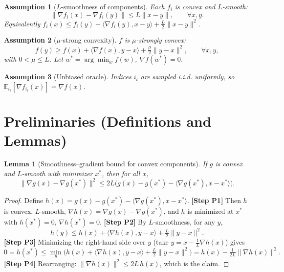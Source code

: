 \documentclass{article}
\newtheorem{lemma}{Lemma}
\newtheorem{assumption}{Assumption}
\begin{document}
\begin{assumption}[$L$-smoothness of components]\label{as:smooth}
Each $f_i$ is convex and $L$-smooth:
\[
\|\nabla f_i(x) - \nabla f_i(y)\| \le L\|x-y\|, \qquad \forall x,y.
\]
Equivalently $f_i(x) \le f_i(y) + \langle \nabla f_i(y), x-y\rangle + \tfrac{L}{2}\|x-y\|^2$.
\end{assumption}

\begin{assumption}[$\mu$-strong convexity]\label{as:sc}
$f$ is $\mu$-strongly convex:
\[
f(y) \ge f(x) + \langle \nabla f(x), y-x\rangle + \tfrac{\mu}{2}\|y-x\|^2, \qquad \forall x,y,
\]
with $0 < \mu \le L$. Let $w^*=\arg\min_w f(w)$, $\nabla f(w^*)=0$.
\end{assumption}

\begin{assumption}[Unbiased oracle]\label{as:unbiased}
Indices $i_t$ are sampled i.i.d. uniformly, so $\mathbb{E}_{i_t}[\nabla f_{i_t}(x)] = \nabla f(x)$.
\end{assumption}

\section*{Preliminaries (Definitions and Lemmas)}

\begin{lemma}[Smoothness--gradient bound for convex components]\label{lem:cocoercive}
If $g$ is convex and $L$-smooth with minimizer $x^*$, then for all $x$,
\[
\|\nabla g(x) - \nabla g(x^*)\|^2 \le 2L\big(g(x) - g(x^*) - \langle \nabla g(x^*), x - x^*\rangle\big).
\]
\end{lemma}

\begin{proof}
Define $h(x) = g(x) - g(x^*) - \langle \nabla g(x^*), x-x^*\rangle$. \textbf{[Step P1]} Then $h$ is convex, $L$-smooth, $\nabla h(x) = \nabla g(x) - \nabla g(x^*)$, and $h$ is minimized at $x^*$ with $h(x^*)=0$, $\nabla h(x^*)=0$.
\textbf{[Step P2]} By $L$-smoothness, for any $y$,
\[
h(y) \le h(x) + \langle \nabla h(x), y-x\rangle + \tfrac{L}{2}\|y-x\|^2.
\]
\textbf{[Step P3]} Minimizing the right-hand side over $y$ (take $y = x - \tfrac{1}{L}\nabla h(x)$) gives
\[
0 = h(x^*) \le \min_y \Big( h(x) + \langle \nabla h(x), y-x\rangle + \tfrac{L}{2}\|y-x\|^2 \Big) = h(x) - \tfrac{1}{2L}\|\nabla h(x)\|^2.
\]
\textbf{[Step P4]} Rearranging: $\|\nabla h(x)\|^2 \le 2L\, h(x)$, which is the claim.
\end{proof}
\end{document}
